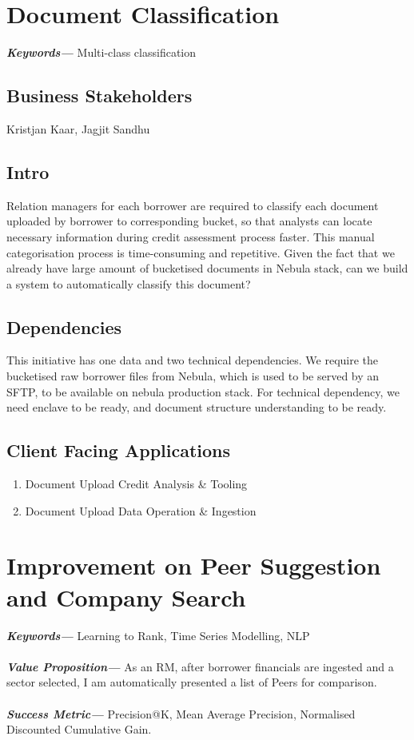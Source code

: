 \documentclass[]{article}
\providecommand{\keywords}[1]{\textbf{\textit{Keywords---}} #1}
\providecommand{\values}[1]{\textbf{\textit{Value Proposition---}} #1}
\providecommand{\successmetric}[1]{\textbf{\textit{Success Metric---}} #1}
\begin{document}
\newpage

\section{Document Classification}
\keywords{Multi-class classification}
\subsection{Business Stakeholders}
Kristjan Kaar, Jagjit Sandhu
\subsection{Intro}
Relation managers for each borrower are required to classify each document 
uploaded by borrower to corresponding bucket, so that analysts can 
locate necessary information during credit assessment process faster. This 
manual categorisation process is time-consuming and repetitive. Given the fact 
that we already have large amount of bucketised documents in Nebula stack, can 
we build a system to automatically classify this document?

\subsection{Dependencies}
This initiative has one data and two technical dependencies. We require the 
bucketised raw borrower files from Nebula, which is used to be served by an 
SFTP, to be available on nebula production stack. For technical dependency, we 
need enclave \cite{ppdp2019on} to be ready, and document structure 
understanding to be ready. 

\subsection{Client Facing Applications}
\begin{enumerate}
    \item Document Upload \textrightarrow Credit Analysis \& Tooling
    \item Document Upload \textrightarrow Data Operation \& Ingestion
\end{enumerate}


\newpage

\section{Improvement on Peer Suggestion and Company Search}
\keywords{Learning to Rank, Time Series Modelling, NLP}
\\\\
\noindent
\values{As an RM, after borrower financials are ingested 
    and a sector selected, I am automatically presented a list of Peers for 
    comparison.}
\\\\
\noindent
\successmetric{Precision@K, Mean Average Precision, Normalised 
    Discounted Cumulative Gain.}
\end{document}
